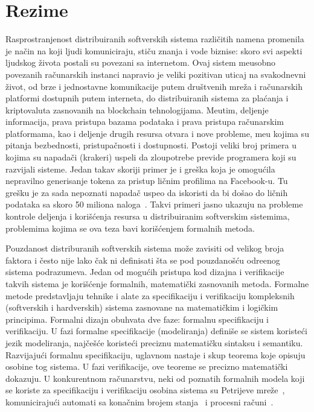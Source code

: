 \chapter*{Rezime}
\pagestyle{plain}
%

Rasprostranjenost distribuiranih softverskih sistema razli\v citih namena promenila je na\v cin na koji ljudi komuniciraju, sti\v cu znanja i vode biznise: skoro svi aspekti ljudskog \v zivota postali su povezani sa internetom. Ovaj sistem me\dj usobno povezanih ra\v cunarskih instanci napravio je veliki pozitivan uticaj na svakodnevni \v zivot, od brze i jednostavne komunikacije putem dru\v stvenih mre\v za i ra\v cunarskih platformi dostupnih putem interneta, do distribuiranih sistema za pla\' canja i kriptovaluta zasnovanih na blockchain tehnologijama.  
Me\dj utim, deljenje informacija, prava pristupa bazama podataka i prava pristupa ra\v cunarskim platformama, kao i deljenje drugih resursa otvara i nove probleme, me\dj u kojima su pitanja bezbednosti, pristupa\v cnosti i dostupnosti. Postoji veliki broj primera u kojima su napada\v ci (krakeri) uspeli da zloupotrebe previde programera koji su razvijali sisteme. Jedan takav skoriji primer je i gre\v ska koja je omogu\' cila nepravilno generisanje tokena za pristup li\v cnim profilima na Facebook-u. Tu gre\v sku je za sada nepoznati napada\v c uspeo da iskoristi da bi do\v sao do li\v cnih podataka sa skoro 50 miliona naloga~\cite{fb_attack}.
Takvi primeri jasno ukazuju na probleme kontrole deljenja i kori\v s\' cenja resursa u distribuiranim softverskim sistemima, problemima kojima se ova teza bavi kori\v s\' cenjem formalnih metoda.

Pouzdanost distriburanih softverskih sistema mo\v ze zavisiti od velikog broja faktora i \v cesto nije lako \v cak ni definisati \v sta se pod pouzdano\v s\' cu odre\dj enog sistema podrazumeva. Jedan od mogu\' cih pristupa kod dizajna i verifikacije takvih sistema je kori\v s\' cenje formalnih, matemati\v cki zasnovanih metoda. Formalne metode predstavljaju tehnike i alate za specifikaciju i verifikaciju kompleksnih (softverskih i hardverskih) sistema zasnovane na matemati\v ckim i logi\v ckim principima. Formalni dizajn obuhvata dve faze: formalnu specifikaciju i verifikaciju. U fazi formalne specifikacije (modeliranja) defini\v se se sistem koriste\' ci jezik modeliranja, naj\v ce\v s\' ce koriste\' ci preciznu matemati\v cku sintaksu i semantiku. Razvijaju\' ci formalnu specifikaciju, uglavnom nastaje i skup teorema koje opisuju osobine tog sistema. U fazi verifikacije, ove teoreme se precizno matemati\v cki dokazuju. %
U konkurentnom ra\v cunarstvu, neki od poznatih formalnih modela koji se koriste za specifikaciju i verifikaciju osobina sistema su Petrijeve mre\v ze~\cite{petri1962kommunikation, DBLP:books/daglib/0032298}, komuniciraju\' ci automati sa kona\v cnim brojem stanja~\cite{DBLP:journals/jacm/BrandZ83} i procesni ra\v cuni~\cite{ DBLP:books/ph/Hoare85, DBLP:books/sp/Milner80, DBLP:journals/iandc/MilnerPW92a, DBLP:journals/iandc/MilnerPW92b}.


